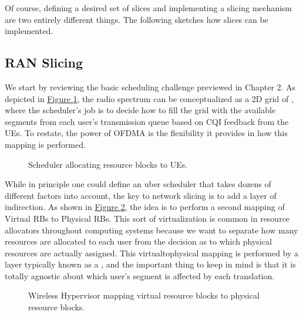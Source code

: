 \documentclass[a4paper,11pt,english]{sphinxmanual}
\let\sphinxpxdimen\pdfpxdimen\else\newdimen\sphinxpxdimen
\begin{document}
\sphinxAtStartPar
Of course, defining a desired set of slices and implementing a slicing
mechanism are two entirely different things. The following sketches
how slices can be implemented.


\subsection{RAN Slicing}
\label{\detokenize{disaggregate:ran-slicing}}
\sphinxAtStartPar
We start by reviewing the basic scheduling challenge previewed in
Chapter 2. As depicted in \hyperref[\detokenize{disaggregate:fig-slice-sched}]{Figure \ref{\detokenize{disaggregate:fig-slice-sched}}},
the radio spectrum can be conceptualized as a 2\sphinxhyphen{}D grid of
, where the scheduler’s job is to decide how to fill the
grid with the available segments from each user’s transmission queue
based on CQI feedback from the UEs. To restate, the power of OFDMA is
the flexibility it provides in how this mapping is performed.

\begin{figure}[ht]
\centering
\capstart

\noindent\sphinxincludegraphics[width=450\sphinxpxdimen]{{Slide27}.png}
\caption{Scheduler allocating resource blocks to UEs.}\label{\detokenize{disaggregate:id5}}\label{\detokenize{disaggregate:fig-slice-sched}}\end{figure}

\sphinxAtStartPar
While in principle one could define an uber scheduler that takes dozens
of different factors into account, the key to network slicing is to add
a layer of indirection. As shown in \hyperref[\detokenize{disaggregate:fig-hypervisor}]{Figure \ref{\detokenize{disaggregate:fig-hypervisor}}},
the idea is to perform a second mapping of Virtual RBs to
Physical RBs. This sort of virtualization is common in resource
allocators throughout computing systems because we want to separate how
many resources are allocated to each user from the decision as to which
physical resources are actually assigned. This virtual\sphinxhyphen{}to\sphinxhyphen{}physical
mapping is performed by a layer typically known as a , and
the important thing to keep in mind is that it is totally agnostic about
which user’s segment is affected by each translation.

\begin{figure}[ht]
\centering
\capstart

\noindent\sphinxincludegraphics[width=600\sphinxpxdimen]{{Slide28}.png}
\caption{Wireless Hypervisor mapping virtual resource blocks to
physical resource blocks.}\label{\detokenize{disaggregate:id6}}\label{\detokenize{disaggregate:fig-hypervisor}}\end{figure}
\end{document}
